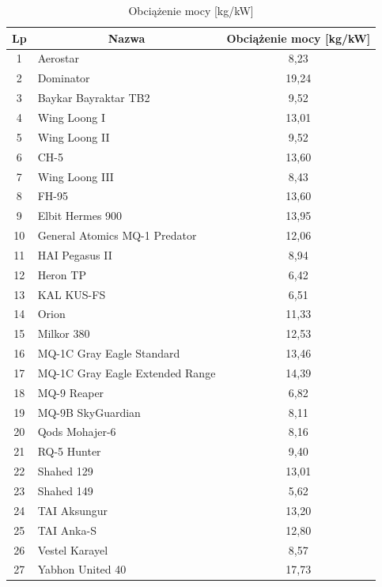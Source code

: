 \documentclass[
    bindingoffset=5mm,
    footnoteindent=3mm,
    hyphenation=true    
]{src/wut-thesis}
\begin{document}
\begin{longtable}{| c | m{0,5\linewidth} | c |}
    \caption{Obciążenie mocy [kg/kW]}
    \label{table:power_load} \\
    \hline
    \textbf{Lp} & \multicolumn{1}{c|}{\textbf{Nazwa}} & \textbf{Obciążenie mocy [kg/kW]} \\ \hline \hline
    \endfirsthead
    
    \hline
    \endfoot
    
    1 & Aerostar & 8,23 \\ \hline
    2 & Dominator & 19,24 \\ \hline
    3 & Baykar Bayraktar TB2 & 9,52 \\ \hline
    4 & Wing Loong I & 13,01 \\ \hline
    5 & Wing Loong II & 9,52 \\ \hline
    6 & CH-5 & 13,60 \\ \hline
    7 & Wing Loong III & 8,43 \\ \hline
    8 & FH-95 & 13,60 \\ \hline
    9 & Elbit Hermes 900 & 13,95 \\ \hline
    10 & General Atomics MQ-1 Predator & 12,06 \\ \hline
    11 & HAI Pegasus II & 8,94 \\ \hline
    12 & Heron TP & 6,42 \\ \hline
    13 & KAL KUS-FS & 6,51 \\ \hline
    14 & Orion & 11,33 \\ \hline
    15 & Milkor 380 & 12,53 \\ \hline
    16 & MQ-1C Gray Eagle Standard & 13,46 \\ \hline
    17 & MQ-1C Gray Eagle Extended Range & 14,39 \\ \hline
    18 & MQ-9 Reaper & 6,82 \\ \hline
    19 & MQ-9B SkyGuardian & 8,11 \\ \hline
    20 & Qods Mohajer-6 & 8,16 \\ \hline
    21 & RQ-5 Hunter & 9,40 \\ \hline
    22 & Shahed 129 & 13,01 \\ \hline
    23 & Shahed 149 & 5,62 \\ \hline
    24 & TAI Aksungur & 13,20 \\ \hline
    25 & TAI Anka-S & 12,80 \\ \hline
    26 & Vestel Karayel & 8,57 \\ \hline
    27 & Yabhon United 40 & 17,73 \\ \hline

\end{longtable}
\end{document}
